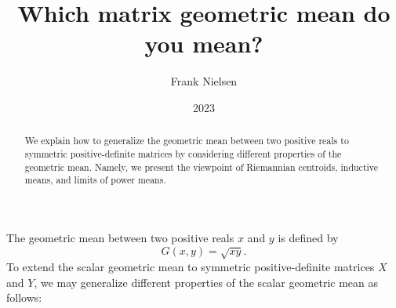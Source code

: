 \documentclass{article}
\title{Which matrix geometric mean do you mean?}
\author{Frank Nielsen}
\date{2023}
\begin{document}
\maketitle


\begin{abstract}
We explain how to generalize the geometric mean between two positive reals to symmetric positive-definite matrices by considering different  properties of the geometric mean.
Namely, we present the viewpoint of Riemannian centroids, inductive means,  and  limits of power means.
\end{abstract}

The geometric mean between two positive reals $x$ and $y$ is defined by 
$$
G(x,y)=\sqrt{xy}.
$$
To extend the scalar geometric mean to symmetric positive-definite matrices $X$ and $Y$, we may generalize different properties of the scalar geometric mean as follows:
\end{document}
